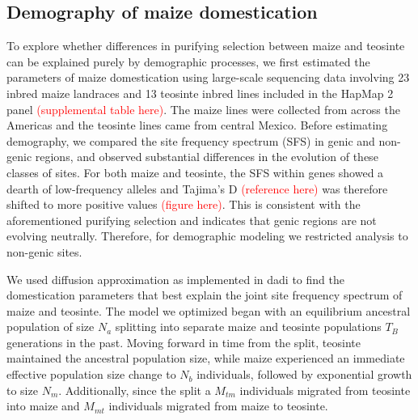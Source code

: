 \documentclass{pnastwo}
\begin{document}
\begin{article}
\subsection{Demography of maize domestication}
To explore whether differences in purifying selection between maize
and teosinte can be explained purely by demographic processes, we
first estimated the parameters of maize domestication using large-scale
sequencing data involving 23 inbred maize
landraces and 13 teosinte inbred lines included in the HapMap 2 panel
\cite{chia2012} \textcolor{red}{(supplemental table here)}. The maize
lines were collected from across the Americas and the teosinte lines
came from central Mexico. Before estimating demography, we compared
the site frequency spectrum (SFS) in genic and non-genic regions, and
observed substantial differences in the evolution of these classes of
sites. For both maize and teosinte, the SFS within genes showed a
dearth of low-frequency alleles and Tajima's D
\textcolor{red}{(reference here)} was therefore shifted
to more positive values \textcolor{red}{(figure here)}. This is consistent with the aforementioned purifying
selection and indicates that genic regions are not evolving
neutrally. Therefore, for demographic modeling we restricted analysis
to non-genic sites.

We used diffusion approximation as implemented in
dadi \cite{gutenkunst2009} to find the domestication parameters that best explain
the joint site frequency spectrum of maize and teosinte.  The model we optimized began with an
equilibrium ancestral population of size $N_a$
splitting into separate maize and teosinte populations $T_B$ generations in the past. Moving forward in
time from the split, teosinte maintained the ancestral population size, while
maize experienced an immediate effective population size change to
$N_b$ individuals, followed by exponential growth to size
$N_m$. Additionally, since the split a $M_{tm}$ individuals migrated
from teosinte into maize and $M_{mt}$ individuals migrated from maize
to teosinte.


\end{article}
\end{document}
